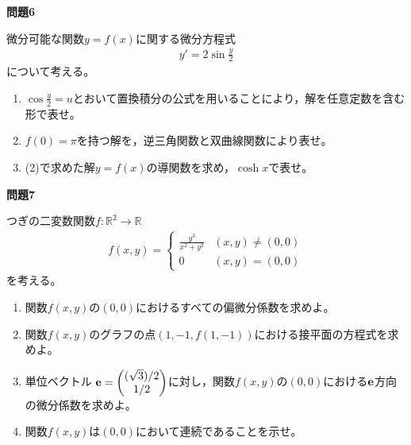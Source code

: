 \documentclass[a4paper,12pt,dvipdfmx,fleqn, oneside]{jsarticle}
\theoremstyle{defstyle}
\theoremstyle{thmx}
\theoremstyle{qesstyle}
\begin{document}
\begin{shadebox}
    \textbf{問題6}

    \text{　}微分可能な関数$y=f(x)$に関する微分方程式
    \begin{align*}
        y'=2 \sin \frac{y}{2}
    \end{align*}
    について考える。
    \begin{enumerate}
        \item $\cos \frac{y}{2}=u$とおいて置換積分の公式を用いることにより，解を任意定数を含む形で表せ。
        \item $f(0)= \pi $を持つ解を，逆三角関数と双曲線関数により表せ。
        \item (2)で求めた解$y=f(x)$の導関数を求め，$\cosh x$で表せ。
    \end{enumerate}
\end{shadebox}
\begin{shadebox}
    \textbf{問題7}

    \text{　}つぎの二変数関数$f: \mathbb{R}^2 \rightarrow \mathbb{R}$
    \begin{align*}
        f(x,y) =
        \begin{cases}
            \frac{y^3}{x^2+y^2} & (x,y) \neq (0,0) \\
            0                   & (x,y)= (0,0)
        \end{cases}
    \end{align*}
    を考える。
    \begin{enumerate}
        \item 関数$f(x,y)$の$(0,0)$におけるすべての偏微分係数を求めよ。
        \item 関数$f(x,y)$のグラフの点$(1,-1,f(1,-1))$における接平面の方程式を求めよ。
        \item 単位ベクトル $\bf{e}=
                  \begin{pmatrix}
                      (\sqrt{3})/2 \\
                      1/2
                  \end{pmatrix}$に対し，関数$f(x,y)$の$(0,0)$における$\bf{e}$方向の微分係数を求めよ。
        \item 関数$f(x,y)$は$(0,0)$において連続であることを示せ。
    \end{enumerate}
\end{shadebox}
\end{document}
